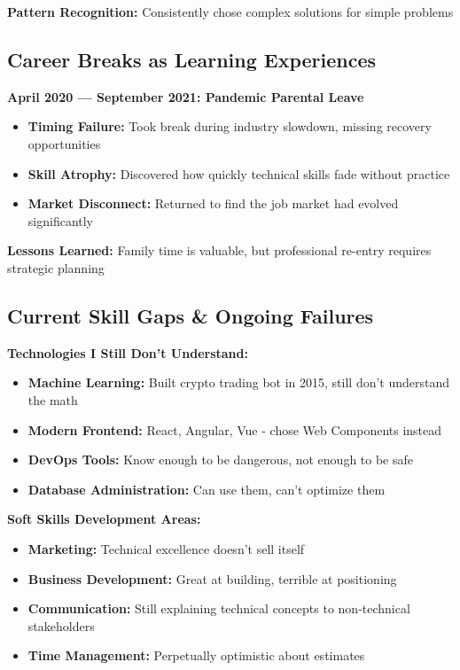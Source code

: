 \documentclass[10pt,a4paper]{article}
\begin{document}
\textbf{Pattern Recognition:} Consistently chose complex solutions for simple problems

\subsection{Career Breaks as Learning Experiences}

\textbf{April 2020 — September 2021: Pandemic Parental Leave}
\begin{itemize}[leftmargin=10pt,itemsep=1pt]
\item \textbf{Timing Failure:} Took break during industry slowdown, missing recovery opportunities
\item \textbf{Skill Atrophy:} Discovered how quickly technical skills fade without practice
\item \textbf{Market Disconnect:} Returned to find the job market had evolved significantly
\end{itemize}

\textbf{Lessons Learned:} Family time is valuable, but professional re-entry requires strategic planning

\subsection{Current Skill Gaps \& Ongoing Failures}
\textbf{Technologies I Still Don't Understand:}
\begin{itemize}[leftmargin=10pt,itemsep=1pt]
\item \textbf{Machine Learning:} Built crypto trading bot in 2015, still don't understand the math
\item \textbf{Modern Frontend:} React, Angular, Vue - chose Web Components instead
\item \textbf{DevOps Tools:} Know enough to be dangerous, not enough to be safe
\item \textbf{Database Administration:} Can use them, can't optimize them
\end{itemize}

\textbf{Soft Skills Development Areas:}
\begin{itemize}[leftmargin=10pt,itemsep=1pt]
\item \textbf{Marketing:} Technical excellence doesn't sell itself
\item \textbf{Business Development:} Great at building, terrible at positioning
\item \textbf{Communication:} Still explaining technical concepts to non-technical stakeholders
\item \textbf{Time Management:} Perpetually optimistic about estimates
\end{itemize}
\end{document}

